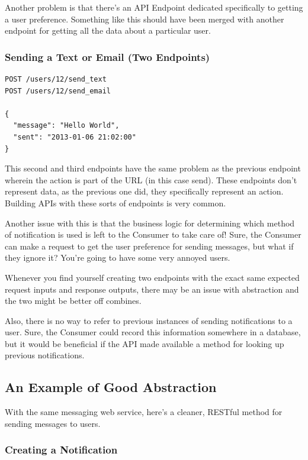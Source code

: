 \documentclass{book}
\begin{document}
Another problem is that there's an API Endpoint dedicated specifically to getting a user preference. Something like this should have been merged with another endpoint for getting all the data about a particular user.

\subsubsection{Sending a Text or Email (Two Endpoints)}

\begin{verbatim}
POST /users/12/send_text
POST /users/12/send_email

{
  "message": "Hello World",
  "sent": "2013-01-06 21:02:00"
}
\end{verbatim}

This second and third endpoints have the same problem as the previous endpoint wherein the action is part of the URL (in this case send). These endpoints don't represent data, as the previous one did, they specifically represent an action. Building APIs with these sorts of endpoints is very common.

Another issue with this is that the business logic for determining which method of notification is used is left to the Consumer to take care of! Sure, the Consumer can make a request to get the user preference for sending messages, but what if they ignore it? You're going to have some very annoyed users.

Whenever you find yourself creating two endpoints with the exact same expected request inputs and response outputs, there may be an issue with abstraction and the two might be better off combines.

Also, there is no way to refer to previous instances of sending notifications to a user. Sure, the Consumer could record this information somewhere in a database, but it would be beneficial if the API made available a method for looking up previous notifications.

\subsection{An Example of Good Abstraction}

With the same messaging web service, here's a cleaner, RESTful method for sending messages to users.

\subsubsection{Creating a Notification}
\end{document}
